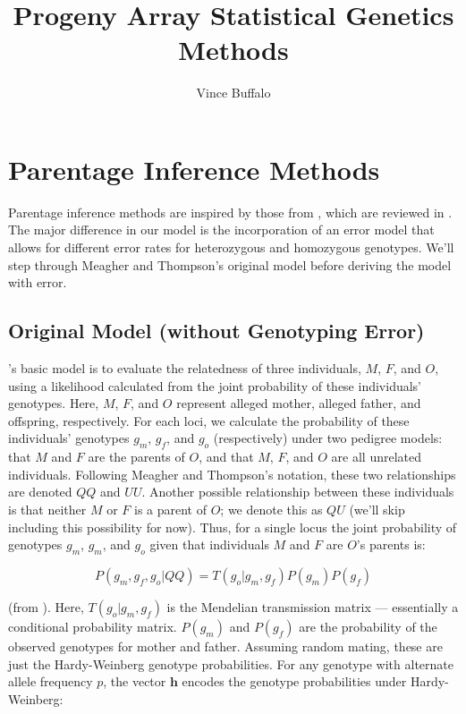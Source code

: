 \documentclass[11pt]{article}
\title{
Progeny Array Statistical Genetics Methods
}
\author{
Vince Buffalo
}
\begin{document}
\maketitle

\section{Parentage Inference Methods}

Parentage inference methods are inspired by those from \citet{meagher1986},
which are reviewed in \citet{marshall1998}. The major difference in our model
is the incorporation of an error model that allows for different error rates
for heterozygous and homozygous genotypes. We'll step through Meagher and
Thompson's original model before deriving the model with error.

\subsection{Original Model (without Genotyping Error)}

\citeauthor{meagher1986}'s basic model is to evaluate the relatedness of three
individuals, $M$, $F$, and $O$, using a likelihood calculated from the joint
probability of these individuals' genotypes. Here, $M$, $F$, and $O$ represent
alleged mother, alleged father, and offspring, respectively. For each loci, we
calculate the probability of these individuals' genotypes $g_m$, $g_f$, and
$g_o$ (respectively) under two pedigree models: that $M$ and $F$ are the
parents of $O$, and that $M$, $F$, and $O$ are all unrelated individuals.
Following Meagher and Thompson's notation, these two relationships are denoted
$QQ$ and $UU$. Another possible relationship between these individuals is that
neither $M$ or $F$ is a parent of $O$; we denote this as $QU$ (we'll skip
including this possibility for now). Thus, for a single locus the joint
probability of genotypes $g_m$, $g_m$, and $g_o$ given that individuals $M$ and
$F$ are $O$'s parents is:

$$ P(g_m, g_f, g_o | QQ) = T(g_o | g_m, g_f) P(g_m) P(g_f) $$

(from \citealt{meagher1986}). Here, $T(g_o | g_m, g_f)$ is the
Mendelian transmission matrix --- essentially a conditional probability matrix.
$P(g_m)$ and $P(g_f)$ are the probability of the observed genotypes for mother
and father. Assuming random mating, these are just the Hardy-Weinberg genotype
probabilities. For any genotype with alternate allele frequency $p$, the vector
$\mathbf{h}$ encodes the genotype probabilities under Hardy-Weinberg:
\end{document}
